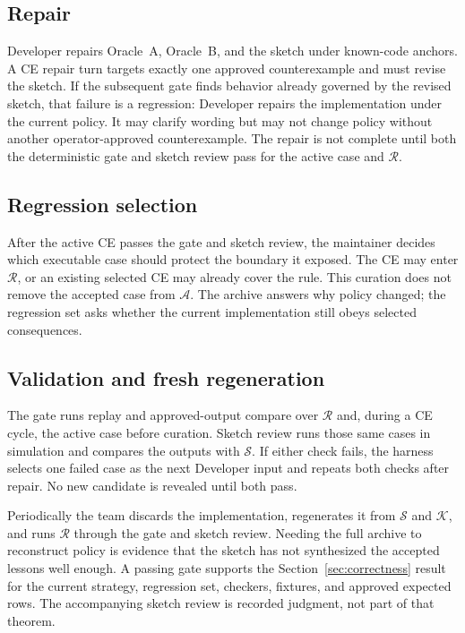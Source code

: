 \documentclass[11pt]{article}
\newcommand{\sketch}{\mathcal{S}}
\newcommand{\archive}{\mathcal{A}}
\newcommand{\regression}{\mathcal{R}}
\newcommand{\anchors}{\mathcal{K}}
\begin{document}
\subsection{Repair}

Developer repairs Oracle~A, Oracle~B, and the sketch under known-code anchors.  A CE repair turn
targets exactly one approved counterexample and must revise the sketch.  If the subsequent gate
finds behavior already governed by the revised sketch, that failure is a regression: Developer
repairs the implementation under the current policy.  It may clarify wording but may not change
policy without another operator-approved counterexample.  The repair is not complete until both
the deterministic gate and sketch review pass for the active case and $\regression$.

\subsection{Regression selection}

After the active CE passes the gate and sketch review, the maintainer decides which executable
case should protect the boundary it exposed.  The CE may enter $\regression$, or an existing
selected CE may already cover the rule.  This curation does not
remove the accepted case from $\archive$.  The archive answers why policy changed; the
regression set asks whether the current implementation still obeys selected consequences.

\subsection{Validation and fresh regeneration}

The gate runs replay and approved-output compare over $\regression$ and, during a CE cycle, the
active case before curation.  Sketch review runs those same cases in simulation and compares the
outputs with $\sketch$.  If either check fails, the harness selects one failed case as the next
Developer input and repeats both checks after repair.  No new candidate is revealed until both
pass.

Periodically the team discards the implementation, regenerates it from $\sketch$ and $\anchors$,
and runs $\regression$ through the gate and sketch review.  Needing the full archive to
reconstruct policy is evidence that the sketch has not synthesized the accepted lessons well
enough.  A passing gate supports the Section~\ref{sec:correctness} result for the current
strategy, regression set, checkers, fixtures, and approved expected rows.  The accompanying
sketch review is recorded judgment, not part of that theorem.
\end{document}
